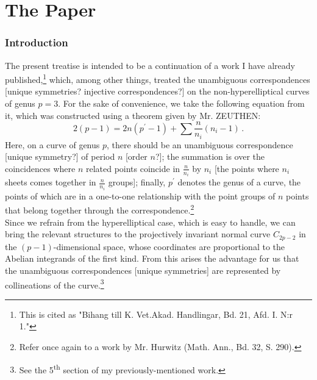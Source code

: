 \documentclass[leqno]{article}
\begin{document}
\part*{The Paper}
\section*{Introduction}
The present treatise is intended to be a continuation of a work I have already published,\footnote{This is cited as "Bihang till K. Vet.Akad. Handlingar, Bd. 21, Afd. I. N:r 1."} which, among other things, treated the unambiguous correspondences [unique symmetries? injective correspondences?] on the non-hyperelliptical curves of genus $p = 3$. 
For the sake of convenience, we take the following equation from it, which was constructed using a theorem given by Mr. ZEUTHEN:
\begin{equation}\label{eq: A}
2(p-1) = 2n(p^\prime-1) + \sum \frac{n}{n_i}(n_i-1) \, . \tag{A}
\end{equation}
Here, on a curve of genus $p$, there should be an unambiguous correspondence [unique symmetry?] of period $n$ [order $n$?]; the summation is over the coincidences where $n$ related points coincide in $\frac{n}{n_i}$ by $n_i$ [the points where $n_i$ sheets comes together in $\frac{n}{n_i}$ groups]; finally, $p^\prime$ denotes the genus of a curve, the points of which are in a one-to-one relationship with the point groups of $n$ points that belong together through the correspondence.\footnote{Refer once again to a work by Mr. Hurwitz (Math. Ann., Bd. 32, S. 290).} \\
Since we refrain from the hyperelliptical case, which is easy to handle, we can bring the relevant structures to the projectively invariant normal curve $C_{2p-2}$ in the $ (p-1) $-dimensional space, whose coordinates are proportional to the Abelian integrands of the first kind. From this arises the advantage for us that the unambiguous correspondences [unique symmetries] are represented by collineations of the curve.\footnote{See the 5\textsuperscript{th} section of my previously-mentioned work.}
\end{document}
